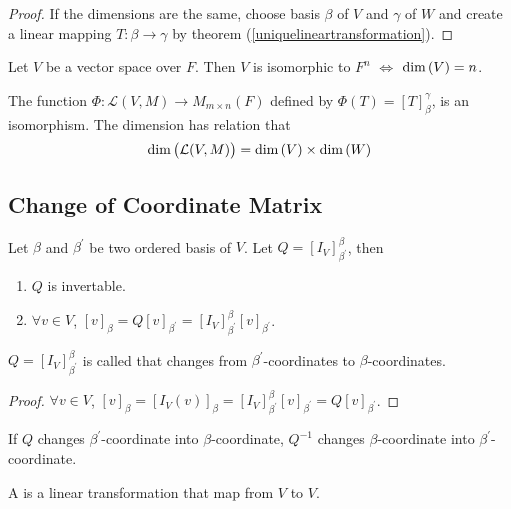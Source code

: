 \begin{proof}
	If the dimensions are the same, choose basis $\beta$ of $V$ and $\gamma$ of $W$ and create a linear mapping $T:\beta \rightarrow \gamma$ by theorem (\ref{uniquelineartransformation}).
\end{proof}


\begin{theorem}
	Let $V$ be a vector space over $F$. Then $V$ is isomorphic to $F^n$ $\Leftrightarrow$ $\displaystyle \text{dim}\left( V \right) = n$.
\end{theorem}


\begin{theorem}
	The function $\Phi: \mathcal{L}(V,M) \rightarrow M_{m \times n}(F)$ defined by $\Phi (T) = [T]_\beta^\gamma$, is an isomorphism. The dimension has relation that 
	\begin{equation}
		\displaystyle \text{dim}\left( \mathcal{L}(V,M) \right) = \displaystyle \text{dim}\left( V \right) \times \displaystyle \text{dim}\left( W \right)
	\end{equation}
\end{theorem}


\subsection{Change of Coordinate Matrix}


\begin{theorem}
	Let $\beta$ and $\beta^\prime$ be two ordered basis of $V$. Let $Q = [I_V]_{\beta^\prime}^\beta$, then
	\begin{enumerate}
		\item $Q$ is invertable.
		\item $\forall v \in V$, $[v]_\beta = Q [v]_{\beta^\prime} = [I_V]_{\beta^\prime}^\beta [v]_{\beta^\prime}$.
	\end{enumerate}
	
	$Q= [I_V]_{\beta^\prime}^\beta$ is called  that changes from $\beta^\prime$-coordinates to $\beta$-coordinates.
\end{theorem}

\begin{proof}
    $\forall v \in V $,  $[v]_\beta = [I_V (v)]_\beta =  [I_V]_{\beta^\prime}^\beta [v]_{\beta^\prime} = Q [v]_{\beta^\prime}$.
\end{proof}

If $Q$ changes $\beta^\prime$-coordinate into $\beta$-coordinate, $Q^{-1}$ changes $\beta$-coordinate into $\beta^\prime$-coordinate.

\begin{definition}
	A  is a linear transformation that map from $V$ to $V$.
\end{definition}

